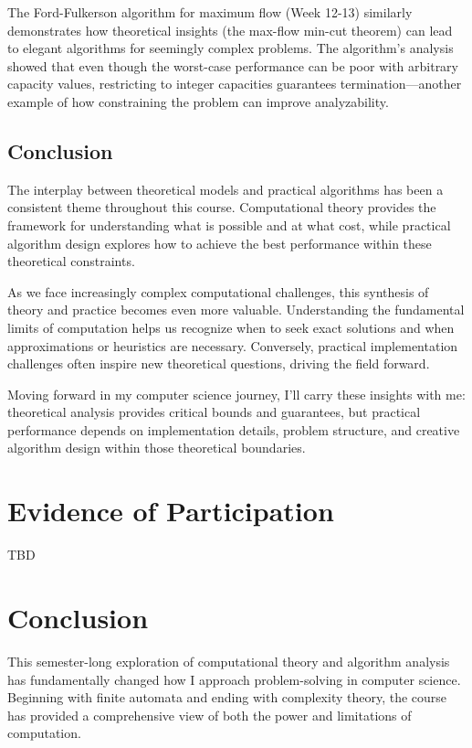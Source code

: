 \documentclass{article}
\theoremstyle{theorem}
\theoremstyle{definition}
\theoremstyle{remark}
\begin{document}
The Ford-Fulkerson algorithm for maximum flow (Week 12-13) similarly demonstrates how theoretical insights (the max-flow min-cut theorem) can lead to elegant algorithms for seemingly complex problems. The algorithm's analysis showed that even though the worst-case performance can be poor with arbitrary capacity values, restricting to integer capacities guarantees termination—another example of how constraining the problem can improve analyzability.

\subsection{Conclusion}

The interplay between theoretical models and practical algorithms has been a consistent theme throughout this course. Computational theory provides the framework for understanding what is possible and at what cost, while practical algorithm design explores how to achieve the best performance within these theoretical constraints.

As we face increasingly complex computational challenges, this synthesis of theory and practice becomes even more valuable. Understanding the fundamental limits of computation helps us recognize when to seek exact solutions and when approximations or heuristics are necessary. Conversely, practical implementation challenges often inspire new theoretical questions, driving the field forward.

Moving forward in my computer science journey, I'll carry these insights with me: theoretical analysis provides critical bounds and guarantees, but practical performance depends on implementation details, problem structure, and creative algorithm design within those theoretical boundaries.



\section{Evidence of Participation}
TBD

\section{Conclusion}\label{conclusion}

This semester-long exploration of computational theory and algorithm analysis has fundamentally changed how I approach problem-solving in computer science. Beginning with finite automata and ending with complexity theory, the course has provided a comprehensive view of both the power and limitations of computation.
\end{document}
